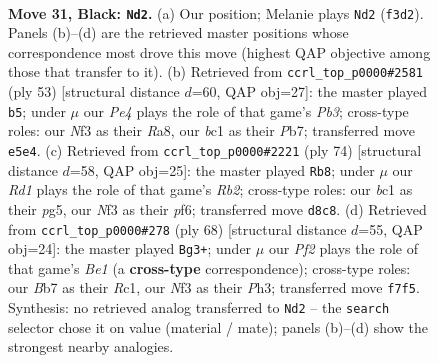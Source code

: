 \documentclass[11pt]{article}
\begin{document}
\clearpage

\begin{figure}[p]\centering
\begin{subfigure}{0.46\textwidth}\centering
\resizebox{\linewidth}{!}{%
\newchessgame
\chessboard[
  setfen={1r1r4/pb1p1pk1/8/2R1p3/6P1/5n2/PP3P2/2BK1B1R b - - 0 31},
  showmover=false,
  pgfstyle=straightmove, color=movearrow, markmove={f3-d2}
]}
\caption{}
\end{subfigure}\hfill
\begin{subfigure}{0.46\textwidth}\centering
\resizebox{\linewidth}{!}{%
\newchessgame
\chessboard[
  setfen={r5k1/1p2r2p/1p1R4/5p2/8/3B4/bP3KPP/7R b - - 1 27},
  showmover=false,
  pgfstyle=straightmove, color=movearrow, markmove={b6-b5}
]}
\caption{}
\end{subfigure}
\\[4pt]
\begin{subfigure}{0.46\textwidth}\centering
\resizebox{\linewidth}{!}{%
\newchessgame
\chessboard[
  setfen={2b1r3/B4k2/2p2p2/6pr/P7/2P4P/1R3PK1/1R6 w - - 1 38},
  showmover=false,
  pgfstyle=straightmove, color=movearrow, markmove={b2-b8}
]}
\caption{}
\end{subfigure}\hfill
\begin{subfigure}{0.46\textwidth}\centering
\resizebox{\linewidth}{!}{%
\newchessgame
\chessboard[
  setfen={1kbr4/5npp/p4p2/P1N5/8/4P2P/6P1/2R1BK2 w - - 5 35},
  showmover=false,
  pgfstyle=straightmove, color=movearrow, markmove={e1-g3}
]}
\caption{}
\end{subfigure}
\caption{\textbf{Move 31, Black: \texttt{Nd2}.} (a) Our position; Melanie plays \texttt{Nd2} (\texttt{f3d2}). Panels (b)--(d) are the retrieved master positions whose correspondence most drove this move (highest QAP objective among those that transfer to it). (b) Retrieved from \texttt{ccrl\_top\_p0000\#2581} (ply 53) [structural distance $d$=60, QAP obj=27]: the master played \texttt{b5}; under $\mu$ our \emph{Pe4} plays the role of that game's \emph{Pb3}; cross-type roles: our \emph{N}f3 as their \emph{R}a8, our \emph{b}c1 as their \emph{P}b7; transferred move \texttt{e5e4}. (c) Retrieved from \texttt{ccrl\_top\_p0000\#2221} (ply 74) [structural distance $d$=58, QAP obj=25]: the master played \texttt{Rb8}; under $\mu$ our \emph{Rd1} plays the role of that game's \emph{Rb2}; cross-type roles: our \emph{b}c1 as their \emph{p}g5, our \emph{N}f3 as their \emph{p}f6; transferred move \texttt{d8c8}. (d) Retrieved from \texttt{ccrl\_top\_p0000\#278} (ply 68) [structural distance $d$=55, QAP obj=24]: the master played \texttt{Bg3+}; under $\mu$ our \emph{Pf2} plays the role of that game's \emph{Be1} (a \textbf{cross-type} correspondence); cross-type roles: our \emph{B}b7 as their \emph{R}c1, our \emph{N}f3 as their \emph{P}h3; transferred move \texttt{f7f5}. Synthesis: no retrieved analog transferred to \texttt{Nd2} -- the \texttt{search} selector chose it on value (material / mate); panels (b)--(d) show the strongest nearby analogies.}
\label{fig:thought-m61}
\end{figure}
\end{document}
